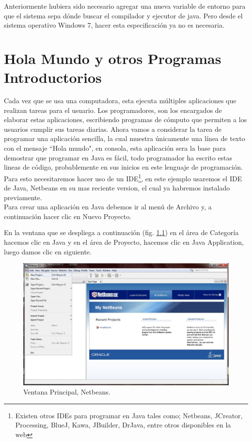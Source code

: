 \documentclass[12pt]{book} %
\begin{document}
Anteriormente hubiera sido necesario agregar una nueva variable de entorno para que el sistema sepa dónde buscar el compilador y ejecutor de java. Pero desde el sistema operativo Windows 7, hacer esta especificación ya no es necesaria.


\chapter{Hola Mundo y otros Programas Introductorios}

Cada vez que se usa una computadora, esta ejecuta múltiples aplicaciones que realizan tareas para el usuario. Los programadores, son los encargados de elaborar estas aplicaciones, escribiendo programas de cómputo que permiten a los usuarios cumplir sus tareas diarias.
Ahora vamos a considerar la tarea de programar una aplicación sencilla, la cual muestra únicamente una línea de texto con el mensaje ``Hola mundo", en consola, esta aplicación sera la base para demostrar que programar en Java es fácil, todo programador ha escrito estas lineas de código, probablemente en sus inicios en este lenguaje de programación.
Para esto necesitaremos hacer uso de un IDE\footnote{Existen otros IDEs para programar en Java tales como; Netbeans, JCreator, Processing, BlueJ, Kawa, JBuilder, DrJava, entre otros disponibles en la web}, en este ejemplo usaremos el IDE de Java, Netbeans en su mas reciente version, el cual ya habremos instalado previamente. \\Para crear una aplicación en Java debemos ir al menú de Archivo y, a continuación hacer clic en Nuevo Proyecto.

En la ventana que se despliega a continuación (fig. \ref{hw01}) en el área de Categoría hacemos clic en Java y en el área de Proyecto, hacemos clic en Java Application, luego damos clic en siguiente.

	\begin{figure}[h]
		\centering
			\includegraphics[width=16cm]{Hola_mundo_001.jpg}
			\caption{Ventana Principal, Netbeans.}
			\label{hw01}
	\end{figure}
\end{document}

